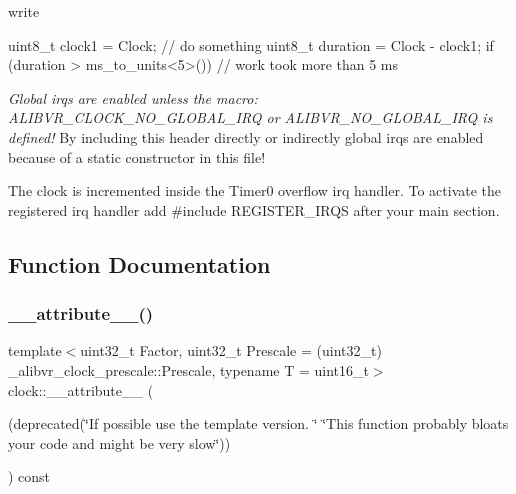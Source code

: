 write


\begin{DoxyCode}
uint8\_t clock1 = Clock;
\textcolor{comment}{// do something}
uint8\_t duration = Clock - clock1;
\textcolor{keywordflow}{if} (duration > ms\_to\_units<5>()) \textcolor{comment}{// work took more than 5 ms}
\end{DoxyCode}


{\itshape Global irqs are enabled unless the macro\+: {\ttfamily A\+L\+I\+B\+V\+R\+\_\+\+C\+L\+O\+C\+K\+\_\+\+N\+O\+\_\+\+G\+L\+O\+B\+A\+L\+\_\+\+I\+RQ} or {\ttfamily A\+L\+I\+B\+V\+R\+\_\+\+N\+O\+\_\+\+G\+L\+O\+B\+A\+L\+\_\+\+I\+RQ} is defined!} By including this header directly or indirectly global irqs are enabled because of a static constructor in this file!

The clock is incremented inside the {\ttfamily Timer0} overflow irq handler. To activate the registered irq handler add {\ttfamily \#include R\+E\+G\+I\+S\+T\+E\+R\+\_\+\+I\+R\+QS} after your {\ttfamily main} section. 

\subsection{Function Documentation}
\hypertarget{namespaceclock_aaadef4e91948a79985a42ebbd57fe2d1}{}\label{namespaceclock_aaadef4e91948a79985a42ebbd57fe2d1} 
\subsubsection{\texorpdfstring{\+\_\+\+\_\+attribute\+\_\+\+\_\+()}{\_\_attribute\_\_()}\hspace{0.1cm}{\footnotesize\ttfamily [1/2]}}
{\footnotesize\ttfamily template$<$uint32\+\_\+t Factor, uint32\+\_\+t Prescale = (uint32\+\_\+t) \+\_\+alibvr\+\_\+clock\+\_\+prescale\+::\+Prescale, typename T  = uint16\+\_\+t$>$ \\
clock\+::\+\_\+\+\_\+attribute\+\_\+\+\_\+ (\begin{DoxyParamCaption}\item[{(deprecated(\char`\"{}If possible use the template version.  \char`\"{} \char`\"{}This function probably bloats your code and might be very slow\char`\"{}))}]{ }\end{DoxyParamCaption}) const}



